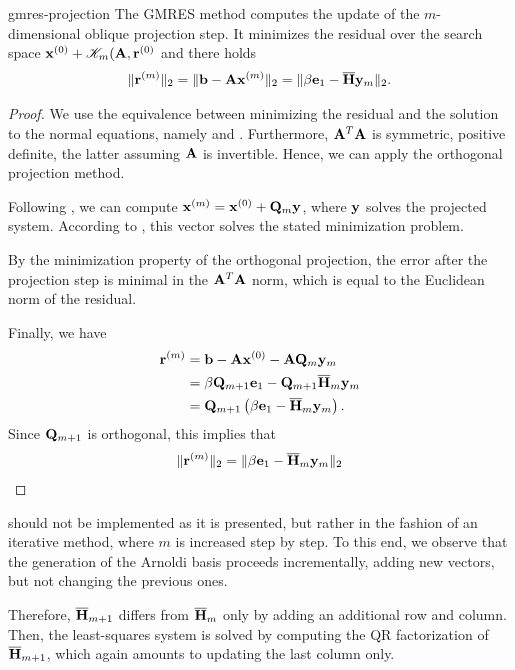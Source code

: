 \begin{Theorem}{gmres-projection}
  The GMRES method computes the update of the $m$-dimensional oblique
  projection step. It minimizes the residual over the search space
  $\mathbf x^{(0)} +\mathscr K_m(\mathbf A,\mathbf r^{(0)}$ and there holds
  \begin{gather}
    \label{eq:gmres-norm}
    \lVert\mathbf r^{(m)}\rVert_2 = \lVert\mathbf b-\mathbf A\mathbf x^{(m)}\rVert_2 =
    \lVert\beta\mathbf e_1 - \overline{\mathbf H} \mathbf y_m\rVert_2.
  \end{gather}
\end{Theorem}

\begin{proof}
  We use the equivalence between minimizing the residual and the
  solution to the normal equations, namely
   and
  .  Furthermore, $\mathbf A^T\mathbf A$
  is symmetric, positive definite, the latter assuming $\mathbf A$ is
  invertible. Hence, we can apply the orthogonal projection method.

  Following , we can compute
  $\mathbf x^{(m)} = \mathbf x^{(0)} + \mathbf Q_m\mathbf y$, where $\mathbf y$ solves the
  projected system. According to ,
  this vector solves the stated minimization problem.
  
  By the minimization property of the orthogonal projection, the error
  after the projection step is minimal in the $\mathbf A^T\mathbf A$ norm,
  which is equal to the Euclidean norm of the residual.

  Finally, we have
  \begin{align}
    \mathbf r^{(m)}
    &= \mathbf b-\mathbf A\mathbf x^{(0)} - \mathbf A\mathbf Q_m\mathbf y_m\\
    &=\beta\mathbf Q_{m+1}\mathbf e_1 - \mathbf Q_{m+1}\overline{\mathbf H}_m\mathbf y_m\\
    &= \mathbf Q_{m+1}\left(\beta\mathbf e_1 - \overline{\mathbf H}_m\mathbf y_m\right).
  \end{align}
  Since $\mathbf Q_{m+1}$ is orthogonal, this implies that
  \begin{gather}
    \lVert\mathbf r^{(m)}\rVert_2 = \lVert\beta\mathbf e_1 - \overline{\mathbf H}_m\mathbf y_m\rVert_2
  \end{gather}
\end{proof}

\begin{remark}
   should not be implemented as it is
  presented, but rather in the fashion of an iterative method, where
  $m$ is increased step by step. To this end, we observe that the
  generation of the Arnoldi basis proceeds incrementally, adding new
  vectors, but not changing the previous ones.

  Therefore, $\overline{\mathbf H}_{m+1}$ differs from $\overline{\mathbf H}_{m}$
  only by adding an additional row and column. Then, the least-squares
  system is solved by computing the QR factorization of
  $\overline{\mathbf H}_{m+1}$, which again amounts to updating the last
  column only.
\end{remark}


